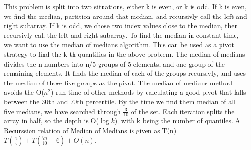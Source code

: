 \documentclass[10pt]{article}
\newenvironment{solution}[2][Solution]{\begin{trivlist}
\item[\hskip \labelsep {\bfseries #1}\hskip \labelsep {\bfseries #2.}]}{\end{trivlist}}
\theoremstyle{definition}
\begin{document}
\begin{solution}{(5)}
This problem is split into two situations, either k is even, or k is odd. If k is even, we find the median, partition around that median, and recursivly call the left and right subarray. If k is odd, we chose two index values close to the median, then recursivly call the left and right subarray. To find the median in constant time, we want to use the median of medians algorithm. This can be used as a pivot strategy to find the k-th quantilies in the above problem. The median of medians divides the n numbers into n/5 groups of 5 elements, and one group of the remaining elements. It finds the median of each of the groups recursivly, and uses the median of those five groups as the pivot. The median of medians method avoids the O($n^2$) run time of other methods by calculating a good pivot that falls between the 30th and 70th percentile. By the time we find them median of all five medians, we have searched through $\frac{3}{10}$ of the set. Each iteration splits the array in half, so the depth is O($\log{k}$), with k being the number of quantiles. A Recurssion relation of Median of Medians is given as T(n) = $T(\frac{n}{5}) + T(\frac{7n}{10} + 6) + O(n)$.
\end{solution}



 
\end{document}
